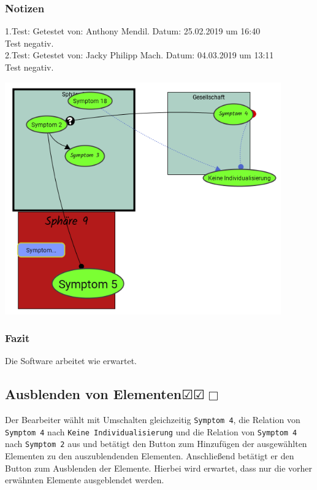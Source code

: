 \documentclass[enabledeprecatedfontcommands]{scrartcl}
\newcommand{\subsectiont}[2]{\subsection[#1]{#1{\normalsize\normalfont #2}}}
\newcommand{\leer}{$\Box$}
\newcommand{\ok}{$\CheckedBox$}
\begin{document}
\subsubsection{Notizen}
1.Test: Getestet von: Anthony Mendil. Datum: 25.02.2019 um 16:40 \\
Test negativ. \\
2.Test: Getestet von: Jacky Philipp Mach. Datum: 04.03.2019 um 13:11 \\
Test negativ.
\begin{center}
\includegraphics[height=10cm]{3_52.PNG}
\end{center}
\subsubsection{Fazit}
Die Software arbeitet wie erwartet.

\subsectiont{Ausblenden von Elementen}{\dotfill\ok\ok\leer}
Der Bearbeiter wählt mit Umschalten gleichzeitig \texttt{Symptom 4}, die Relation von  \texttt{Symptom 4} nach \texttt{Keine Individualisierung} und die Relation von \texttt{Symptom 4} nach \texttt{Symptom 2} aus und betätigt den Button zum Hinzufügen der ausgewählten Elementen zu den auszublendenden Elementen. Anschließend betätigt er den Button zum Ausblenden der Elemente. Hierbei wird erwartet, dass nur die vorher erwähnten Elemente ausgeblendet werden. 
\end{document}
